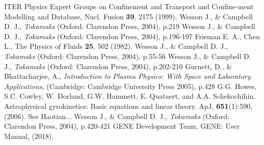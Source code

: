 \documentclass[12pt]{article}
\numberwithin{equation}{subsection}
\begin{document}
\begin{thebibliography}{0}
   
    ITER Physics Expert Groups on Confinement and Transport and Confine-ment Modelling and Database, Nucl. Fusion \textbf{39}, 2175 (1999).
    Wesson J., \& Campbell D. J., \textit{Tokamaks} (Oxford: Clarendon Press, 2004), p.219
    Wesson J., \& Campbell D. J., \textit{Tokamaks} (Oxford: Clarendon Press, 2004), p.196-197
    Frieman E. A., Chen L., The Physics of Fluids \textbf{25}, 502 (1982).
    Wesson J., \& Campbell D. J., \textit{Tokamaks} (Oxford: Clarendon Press, 2004), p.55-56
    Wesson J., \& Campbell D. J., \textit{Tokamaks} (Oxford: Clarendon Press, 2004), p.202-210
    Gurnett, D., \& Bhattacharjee, A., \textit{Introduction to Plasma Physics: With Space and Laboratory Applications},
                       (Cambridge: Cambridge University Press 2005), p.428
    G.G. Howes, S.C. Cowley, W. Dorland, G.W. Hammett, E. Quataert, and A.A. Schekochihin.
                         Astrophysical gyrokinetics: Basic equations and linear theory. ApJ, \textbf{651}(1):590, (2006).
    See Haotian...
    Wesson J., \& Campbell D. J., \textit{Tokamaks} (Oxford: Clarendon Press, 2004), p.420-421
    GENE Development Team, GENE: User Manual, (2018).

\end{thebibliography}
    
\end{document}
